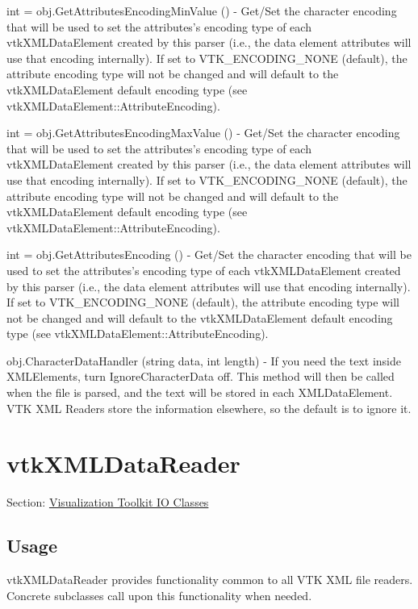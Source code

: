 \begin{DoxyItemize}
\item {\ttfamily int = obj.\-Get\-Attributes\-Encoding\-Min\-Value ()} -\/ Get/\-Set the character encoding that will be used to set the attributes's encoding type of each vtk\-X\-M\-L\-Data\-Element created by this parser (i.\-e., the data element attributes will use that encoding internally). If set to V\-T\-K\-\_\-\-E\-N\-C\-O\-D\-I\-N\-G\-\_\-\-N\-O\-N\-E (default), the attribute encoding type will not be changed and will default to the vtk\-X\-M\-L\-Data\-Element default encoding type (see vtk\-X\-M\-L\-Data\-Element\-::\-Attribute\-Encoding).  
\item {\ttfamily int = obj.\-Get\-Attributes\-Encoding\-Max\-Value ()} -\/ Get/\-Set the character encoding that will be used to set the attributes's encoding type of each vtk\-X\-M\-L\-Data\-Element created by this parser (i.\-e., the data element attributes will use that encoding internally). If set to V\-T\-K\-\_\-\-E\-N\-C\-O\-D\-I\-N\-G\-\_\-\-N\-O\-N\-E (default), the attribute encoding type will not be changed and will default to the vtk\-X\-M\-L\-Data\-Element default encoding type (see vtk\-X\-M\-L\-Data\-Element\-::\-Attribute\-Encoding).  
\item {\ttfamily int = obj.\-Get\-Attributes\-Encoding ()} -\/ Get/\-Set the character encoding that will be used to set the attributes's encoding type of each vtk\-X\-M\-L\-Data\-Element created by this parser (i.\-e., the data element attributes will use that encoding internally). If set to V\-T\-K\-\_\-\-E\-N\-C\-O\-D\-I\-N\-G\-\_\-\-N\-O\-N\-E (default), the attribute encoding type will not be changed and will default to the vtk\-X\-M\-L\-Data\-Element default encoding type (see vtk\-X\-M\-L\-Data\-Element\-::\-Attribute\-Encoding).  
\item {\ttfamily obj.\-Character\-Data\-Handler (string data, int length)} -\/ If you need the text inside X\-M\-L\-Elements, turn Ignore\-Character\-Data off. This method will then be called when the file is parsed, and the text will be stored in each X\-M\-L\-Data\-Element. V\-T\-K X\-M\-L Readers store the information elsewhere, so the default is to ignore it.  
\end{DoxyItemize}\hypertarget{vtkio_vtkxmldatareader}{}\section{vtk\-X\-M\-L\-Data\-Reader}\label{vtkio_vtkxmldatareader}
Section\-: \hyperlink{sec_vtkio}{Visualization Toolkit I\-O Classes} \hypertarget{vtkwidgets_vtkxyplotwidget_Usage}{}\subsection{Usage}\label{vtkwidgets_vtkxyplotwidget_Usage}
vtk\-X\-M\-L\-Data\-Reader provides functionality common to all V\-T\-K X\-M\-L file readers. Concrete subclasses call upon this functionality when needed.

